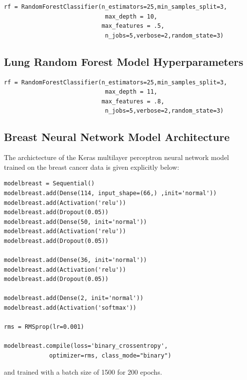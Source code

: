 \documentclass[10pt,letterpaper]{article}
\begin{document}
\begin{verbatim}
rf = RandomForestClassifier(n_estimators=25,min_samples_split=3,
                             max_depth = 10,
                            max_features = .5,
                             n_jobs=5,verbose=2,random_state=3)
\end{verbatim}



\subsection*{Lung Random Forest Model Hyperparameters}
\label{subsec:lungrf}



\begin{verbatim}
rf = RandomForestClassifier(n_estimators=25,min_samples_split=3,
                             max_depth = 11,
                            max_features = .8,
                             n_jobs=5,verbose=2,random_state=3)
\end{verbatim}




\subsection*{Breast Neural Network Model Architecture}
\label{subsec:breastnn}

The archictecture of the Keras multilayer perceptron neural network model 
trained on the breast cancer data is given explicitly below:

\begin{verbatim}
modelbreast = Sequential()
modelbreast.add(Dense(114, input_shape=(66,) ,init='normal'))
modelbreast.add(Activation('relu'))
modelbreast.add(Dropout(0.05))
modelbreast.add(Dense(50, init='normal'))
modelbreast.add(Activation('relu'))
modelbreast.add(Dropout(0.05))

modelbreast.add(Dense(36, init='normal'))
modelbreast.add(Activation('relu'))
modelbreast.add(Dropout(0.05))

modelbreast.add(Dense(2, init='normal'))
modelbreast.add(Activation('softmax'))

rms = RMSprop(lr=0.001)

modelbreast.compile(loss='binary_crossentropy', 
             optimizer=rms, class_mode="binary")

\end{verbatim}

and trained with a batch size of 1500 for 200 epochs.
\end{document}
